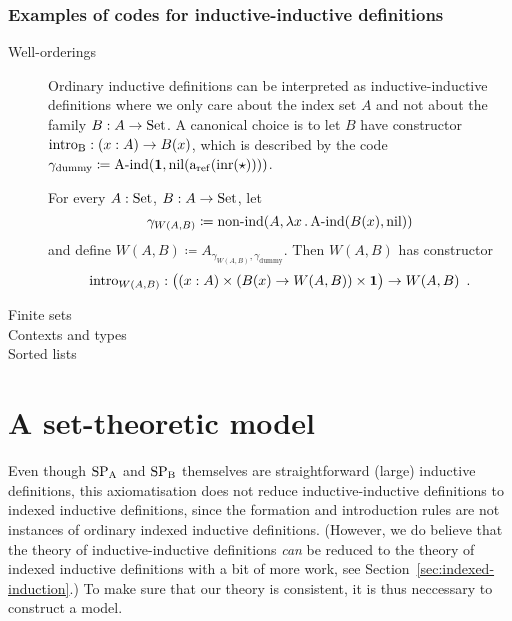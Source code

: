 \documentclass{article}
\begin{document}
\subsubsection{Examples of codes for inductive-inductive definitions}

\begin{description}
\item[Well-orderings] Ordinary inductive definitions can be
  interpreted as inductive-inductive definitions where we only care
  about the index set $A$ and not about the family $B : A \to \text{Set}$. A
  canonical choice is to let $B$ have constructor $\text{intro}_{\mathrm{B}} : (x : A)
  \to B(x)$, which is described by the code $\gamma_{\text{dummy}} \coloneqq 
  \text{A-ind}(\mathbf{1}, \text{nil}(\text{a}_{\mathrm{ref}}(\text{inr}(\star))))$.

  For every $A : \text{Set}$, $B : A \to \text{Set}$, let
  \[
  \gamma_{W(A, B)} \coloneqq \text{non-ind}(A, \lambda x\,.\,\text{A-ind}(B(x),\text{nil}))
  \]
  and define $W(A, B) \coloneqq A_{\gamma_{W(A, B)},
    \gamma_{\text{dummy}}}$.  Then $W(A, B)$ has constructor
  \[
  \text{intro}_{W(A, B)} : \big((x : A) \times (B(x) \to W(A, B)) \times \mathbf{1}\big) \to W(A, B) \enspace .
  \]

\item[Finite sets]
\item[Contexts and types]
\item[Sorted lists] 
\end{description}





\section{A set-theoretic model}
\label{sec:model}


Even though $\text{SP}_{\mathrm{A}}$ and $\text{SP}_{\mathrm{B}}$ themselves are straightforward (large)
inductive definitions, this axiomatisation does not reduce
inductive-inductive definitions to indexed inductive definitions,
since the formation and introduction rules are not instances of
ordinary indexed inductive definitions.  (However, we do believe that
the theory of inductive-inductive definitions \emph{can} be reduced to
the theory of indexed inductive definitions with a bit of more
work, %
see Section~\ref{sec:indexed-induction}.) To make sure that our theory
is consistent, it is thus neccessary to construct a model.
\end{document}
